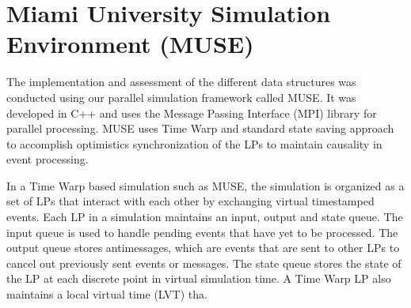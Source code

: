 \section{Miami University Simulation Environment (MUSE)}
The implementation and assessment of the different data structures was conducted using our parallel simulation framework called MUSE. It was developed in C++ and uses the Message Passing Interface (MPI) library for parallel processing. MUSE uses Time Warp and standard state saving approach to accomplish optimistics synchronization of the LPs to maintain causality in event processing.

In a Time Warp based simulation such as MUSE, the simulation is organized as a set of LPs that interact with each other by exchanging virtual timestamped events. Each LP in a simulation maintains an input, output and state queue. The input queue is used to handle pending events that have yet to be processed. The output queue stores antimessages, which are events that are sent to other LPs to cancel out previously sent events or messages. The state queue stores the state of the LP at each discrete point in virtual simulation time. A Time Warp LP also maintains a local virtual time (LVT) tha.       
